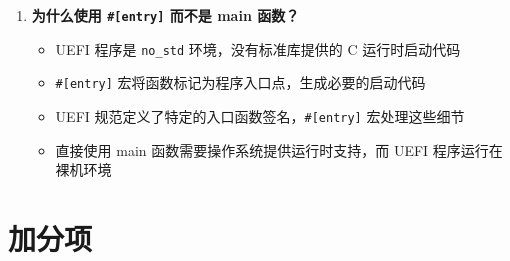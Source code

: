 \documentclass{SYSUReport}
\begin{document}
\begin{enumerate}[label=\arabic*.]
    \item \textbf{为什么使用 \texttt{\#[entry]} 而不是 main 函数？}
    
    \begin{itemize}
        \item UEFI 程序是 \texttt{no\_std} 环境，没有标准库提供的 C 运行时启动代码
        \item \texttt{\#[entry]} 宏将函数标记为程序入口点，生成必要的启动代码
        \item UEFI 规范定义了特定的入口函数签名，\texttt{\#[entry]} 宏处理这些细节
        \item 直接使用 main 函数需要操作系统提供运行时支持，而 UEFI 程序运行在裸机环境
    \end{itemize}
\end{enumerate}

\section{加分项}
\end{document}
